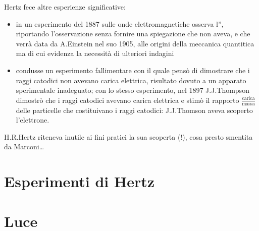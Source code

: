 \documentclass[letterpaper,10pt,italian]{jupyterBook}
\begin{document}
\sphinxAtStartPar
{} 

\sphinxAtStartPar
Hertz fece altre esperienze significative:
\begin{itemize}
\item {} 
\sphinxAtStartPar
in un esperimento del 1887 sulle onde elettromagnetiche osserva l”, riportando l’osservazione senza fornire una spiegazione \sphinxhyphen{} che non aveva, e che verrà data da A.Einstein nel suo  1905, alle origini della meccanica quantitica \sphinxhyphen{} ma di cui evidenza la necessità di ulteriori indagini

\item {} 
\sphinxAtStartPar
condusse un esperimento fallimentare con il quale pensò di dimostrare che i raggi catodici non avevano carica elettrica, risultato dovuto a un apparato sperimentale inadeguato; con lo stesso esperimento, nel 1897 J.J.Thompson dimostrò che i raggi catodici avevano carica elettrica e stimò il rapporto \(\frac{\text{carica}}{\text{massa}}\) delle particelle che costituivano i raggi catodici: J.J.Thomson aveva scoperto l’elettrone.

\end{itemize}

\sphinxAtStartPar
{}  H.R.Hertz riteneva inutile ai fini pratici la sua scoperta (!), cosa presto smentita da Marconi…

\sphinxAtStartPar
{}  


\section{Esperimenti di Hertz}
\label{\detokenize{ch/electromagnetism/em-waves:esperimenti-di-hertz}}\label{\detokenize{ch/electromagnetism/em-waves:physics-hs-electromagnetism-em-waves-hertz}}

\section{Luce}
\label{\detokenize{ch/electromagnetism/em-waves:luce}}\label{\detokenize{ch/electromagnetism/em-waves:physics-hs-electromagnetism-em-waves-light}}
\end{document}
